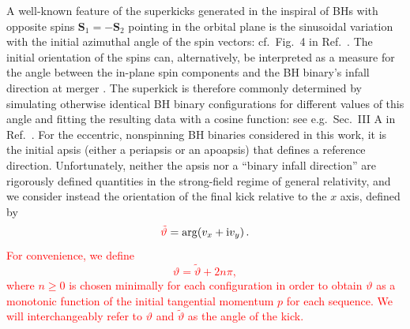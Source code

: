 \documentclass[floats,floatfix,showpacs,amssymb,prd,twocolumn,superscriptaddress,nofootinbib,nolongbibliography,reprint]{revtex4-2}
\newcounter{count}
\newcommand{\mr}[1]{{\textcolor{cyan}{\sf{[MR: #1]}} }}
\newcommand{\us}[1]{{\textcolor{teal}{\sf{[US: #1]}} }}
\newcommand{\eb}[1]{{\textcolor{blue}{\sf{[EB: #1]}} }}
\newcommand{\new}[1]{{\textcolor{red}{ #1} }}
\begin{document}
%
A well-known feature of the superkicks generated in the inspiral
of BHs with opposite spins $\boldsymbol{S}_1=-\boldsymbol{S}_2$
pointing in the orbital
plane is the sinusoidal variation with the initial azimuthal angle
of the spin vectors: cf.~Fig.~4 in Ref.~\cite{Bruegmann:2007zj}.
The initial orientation of the spins can, alternatively, be
interpreted as a measure for the angle between the in-plane
spin components and the BH binary's infall direction at merger
\cite{Lousto:2009ka}. The superkick is therefore commonly
determined by simulating otherwise identical BH binary configurations
for different values of this angle and fitting the resulting data
with a cosine function: see e.g.~Sec.~III A in
Ref.~\cite{Sperhake:2019wwo}. For the eccentric, nonspinning BH
binaries considered in this work, it is the
initial apsis (either a periapsis or an apoapsis)
that defines a reference direction. Unfortunately,
neither the apsis nor a ``binary infall direction''
are rigorously defined
quantities in the strong-field regime of general relativity,
and we consider instead the orientation of the final
kick relative to the $x$ axis, defined by
%
\begin{equation}
  \new{\tilde{\vartheta}} = \mathrm{arg}(v_x + \mathrm{i}v_y)\,.
\end{equation}
\new{For convenience, we define
\begin{equation}
    \vartheta = \tilde{\vartheta} + 2n\pi,
\end{equation}
where $n\geq 0$ is chosen minimally for each configuration in order to obtain
$\vartheta$ as a monotonic function of the initial tangential momentum $p$
for each sequence. We will interchangeably refer to $\vartheta$ 
and $\tilde{\vartheta}$ as the angle of the kick.}
\end{document}
